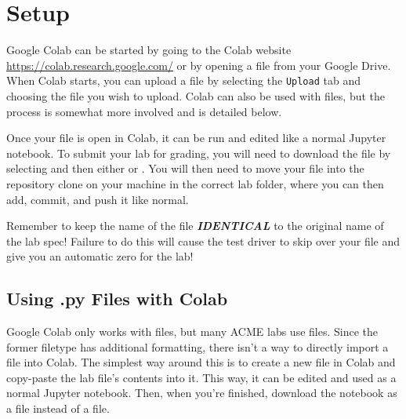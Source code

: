 

\section*{Setup}
Google Colab can be started by going to the Colab website \url{https://colab.research.google.com/} or by opening a  file from your Google Drive.
When Colab starts, you can upload a  file by selecting the \texttt{Upload} tab and choosing the  file you wish to upload.
Colab can also be used with  files, but the process is somewhat more involved and is detailed below.

Once your file is open in Colab, it can be run and edited like a normal Jupyter notebook.
To submit your lab for grading, you will need to download the file by selecting  and then either  or .
You will then need to move your file into the repository clone on your machine in the correct lab folder, where you can then add, commit, and push it like normal.
\begin{warn}
    Remember to keep the name of the file \textbf{\emph{IDENTICAL}} to the original name of the lab spec!
    Failure to do this will cause the test driver to skip over your file and give you an automatic zero for the lab!
\end{warn}

\subsection*{Using .py Files with Colab}
Google Colab only works with  files, but many ACME labs use  files.
Since the former filetype has additional formatting, there isn't a way to directly import a  file into Colab.
The simplest way around this is to create a new file in Colab and copy-paste the lab file's contents into it.
This way, it can be edited and used as a normal Jupyter notebook.
Then, when you're finished, download the notebook as a  file instead of a  file.

